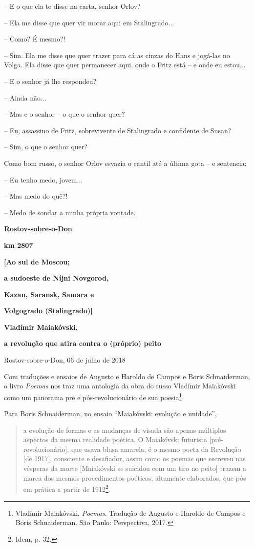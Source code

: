 -- E o que ela te disse na carta, senhor Orlov?

-- Ela me disse que quer vir morar aqui em Stalingrado...

-- Como? É mesmo?!

-- Sim. Ela me disse que quer trazer para cá as cinzas do Hans e
jogá-las no Volga. Ela disse que quer permanecer aqui, onde o Fritz está
-- e onde eu estou...

-- E o senhor já lhe respondeu?

-- Ainda não...

-- Mas e o senhor -- o que o senhor quer?

-- Eu, assassino de Fritz, sobrevivente de Stalingrado e confidente de
Susan?

-- Sim, o que o senhor quer?

Como bom russo, o senhor Orlov esvazia o cantil até a última gota -- e
sentencia:

-- Eu tenho medo, jovem...

-- Mas medo do quê?!

-- Medo de sondar a minha própria vontade.

\textbf{Rostov-sobre-o-Don}

\textbf{km 2807}

\textbf{{[}Ao sul de Moscou; }

\textbf{a sudoeste de Níjni Novgorod, }

\textbf{Kazan, Saransk, Samara e }

\textbf{Volgogrado (Stalingrado){]}}

\textbf{Vladímir Maiakóvski, }

\textbf{a revolução que atira contra o (próprio) peito}

Rostov-sobre-o-Don, 06 de julho de 2018

Com traduções e ensaios de Augusto e Haroldo de Campos e Boris
Schnaiderman, o livro \emph{Poemas} nos traz uma antologia da obra do
russo Vladímir Maiakóvski como um panorama pré e pós-revolucionário de
sua poesia\footnote{Vladímir Maiakóvski, \emph{Poemas.} Tradução de
  Augusto e Haroldo de Campos e Boris Schnaiderman. São Paulo:
  Perspectiva, 2017.}.

Para Boris Schnaiderman, no ensaio ``Maiakóvski: evolução e unidade'',

\begin{quote}
a evolução de formas e as mudanças de visada são apenas múltiplos
aspectos da mesma realidade poética. O Maiakóvski futurista
{[}pré-revolucionário{]}, que usava blusa amarela, é o mesmo poeta da
Revolução {[}de 1917{]}, consciente e desafiador, assim como os poemas
que escreveu nas vésperas da morte {[}Maiakóvski se suicidou com um tiro
no peito{]} trazem a marca dos mesmos procedimentos poéticos, altamente
elaborados, que pôs em prática a partir de 1912\footnote{Idem, p. 32.}.
\end{quote}

